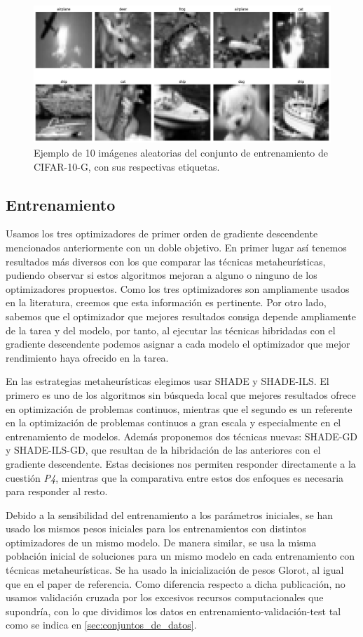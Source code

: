 \begin{figure}
    \centering
    \includegraphics[width=0.75\linewidth]{Plantilla_TFG_latex//imagenes//Inf//exp/cifar10.png}
    \caption{Ejemplo de 10 imágenes aleatorias del conjunto de entrenamiento de CIFAR-10-G, con sus respectivas etiquetas.}
    \label{fig:cifar10}
\end{figure}


\subsection{Entrenamiento}

Usamos los tres optimizadores de primer orden de gradiente descendente mencionados anteriormente con un doble objetivo. En primer lugar así tenemos resultados más diversos con los que comparar las técnicas metaheurísticas, pudiendo observar si estos algoritmos mejoran a alguno o ninguno de los optimizadores propuestos. Como los tres optimizadores son ampliamente usados en la literatura, creemos que esta información es pertinente. Por otro lado, sabemos que el optimizador que mejores resultados consiga depende ampliamente de la tarea y del modelo, por tanto, al ejecutar las técnicas hibridadas con el gradiente descendente podemos asignar a cada modelo el optimizador que mejor rendimiento haya ofrecido en la tarea.

En las estrategias metaheurísticas elegimos usar SHADE y SHADE-ILS. El primero es uno de los algoritmos sin búsqueda local que mejores resultados ofrece en optimización de problemas continuos, mientras que el segundo es un referente en la optimización de problemas continuos a gran escala y especialmente en el entrenamiento de modelos. Además proponemos dos técnicas nuevas: SHADE-GD y SHADE-ILS-GD, que resultan de la hibridación de las anteriores con el gradiente descendente. Estas decisiones nos permiten responder directamente a la cuestión \textit{P4}, mientras que la comparativa entre estos dos enfoques es necesaria para responder al resto.

Debido a la sensibilidad del entrenamiento a los parámetros iniciales, se han usado los mismos pesos iniciales para los entrenamientos con distintos optimizadores de un mismo modelo. De manera similar, se usa la misma población inicial de soluciones para un mismo modelo en cada entrenamiento con técnicas metaheurísticas. Se ha usado la inicialización de pesos Glorot, al igual que en el paper de referencia. Como diferencia respecto a dicha publicación, no usamos validación cruzada por los excesivos recursos computacionales que supondría, con lo que dividimos los datos en entrenamiento-validación-test tal como se indica en \ref{sec:conjuntos_de_datos}.

